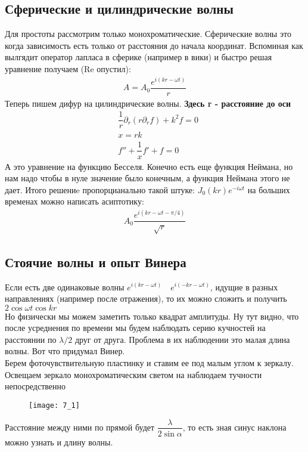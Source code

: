 	\subsection*{Сферические и цилиндрические волны}
	Для простоты рассмотрим только монохроматические. Сферические волны это когда зависимость есть только от расстояния до начала координат. Вспоминая как вылгядит оператор лапласа в сферике (например в вики) и быстро решая уравнение получаем (Re опустил):
	\begin{align*}
	A = A_0 \dfrac{e^{i (kr - \omega t)}}{r}
	\end{align*}
	Теперь пишем дифур на цилиндрические волны. \textbf{Здесь r - расстояние до оси}
	\begin{align*}
	&\dfrac{1}{r} \partial_r (r \partial_r f) + k^2 f = 0\\
	& x = r k\\
	&f'' + \dfrac{1}{x} f' + f = 0
	\end{align*} 
	А это уравнение на функцию Бесселя. Конечно есть еще функция Неймана, но нам надо чтобы в нуле значение было конечным, а функция Неймана этого не дает. Итого решениe пропорцианально такой штуке: $J_0(k r) e^{-i\omega t}$ на больших временах можно написать асиптотику: 
	\begin{align*}
	A_0 \dfrac{e^{i (kr - \omega t - \pi/4)}}{\sqrt{r}}
	\end{align*}
	\subsection*{Стоячие волны и опыт Винера}
	Если есть две одинаковые волны $e^{i (kr - \omega t)} \quad e^{i (-kr - \omega t)}$, идущие в разных направлениях (например после отражения), то их можно сложить и получить $2\cos \omega t \cos k r$\\
	Но физически мы можем заметить только квадрат амплитуды. Ну тут видно, что после усреднения по времени мы будем наблюдать серию кучностей на расстоянии по $\lambda/2$ друг от друга. Проблема в их наблюдении это малая длина волны. Вот что придумал Винер.\\
	Берем фоточувствительную пластинку и ставим ее под малым углом к зеркалу. Освещаем зеркало монохроматическим светом на наблюдаем тучности непосредственно
	\begin{figure}[H]
		\centering
		\texttt{[image: 7\_1]}
	\end{figure}
	Расстояние между ними по прямой будет $\dfrac{\lambda}{2 \sin \alpha}$, то есть зная синус наклона можно узнать и длину волны.  